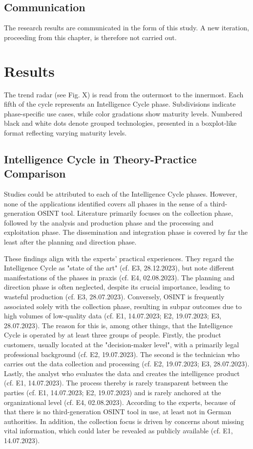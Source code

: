 \documentclass[10pt]{article}
\begin{document}
\subsection{Communication}

The research results are communicated in the form of this study.
A new iteration, proceeding from this chapter, is therefore not
carried out.

\section{Results}

The trend radar (see Fig. X) is read from the outermost to the innermost.
Each fifth of the cycle represents an Intelligence Cycle phase. Subdivisions indicate
phase-specific use cases, while color gradations show maturity levels. Numbered black
and white dots denote grouped technologies, presented in a boxplot-like format reflecting
varying maturity levels.

\subsection{Intelligence Cycle in Theory-Practice Comparison}

Studies could be attributed to each of the Intelligence Cycle phases. However,
none of the applications identified covers all phases in the sense of a third-generation
OSINT tool. Literature primarily focuses on the collection phase, followed by
the analysis and production phase and the processing and exploitation phase.
The dissemination and integration phase is covered by far the least after the planning
and direction phase.

These findings align with the experts' practical experiences. They regard the Intelligence Cycle
as "state of the art" (cf. E3, 28.12.2023), but note different manifestations of the phases in praxis (cf. E4, 02.08.2023).
The planning and direction phase is often neglected, despite its crucial importance, leading to wasteful
production (cf. E3, 28.07.2023). Conversely, OSINT is frequently associated solely with the collection phase,
resulting in subpar outcomes due to high volumes of low-quality data (cf. E1, 14.07.2023; E2, 19.07.2023; E3, 28.07.2023).
The reason for this is, among other things, that the Intelligence Cycle is operated by at least three groups of people.
Firstly, the product customers, usually located at the "decision-maker level", with a primarily legal professional background (cf. E2, 19.07.2023).
The second is the technician who carries out the data collection and processing (cf. E2, 19.07.2023; E3, 28.07.2023).
Lastly, the analyst who evaluates the data and creates the intelligence product
(cf. E1, 14.07.2023). The process thereby is rarely transparent between the parties
(cf. E1, 14.07.2023; E2, 19.07.2023) and is rarely anchored at the organizational level
(cf. E4, 02.08.2023). According to the experts, because of that there is no third-generation
OSINT tool in use, at least not in German authorities. In addition, the collection focus is driven by concerns
about missing vital information, which could later be revealed as publicly available (cf. E1, 14.07.2023).
\end{document}
